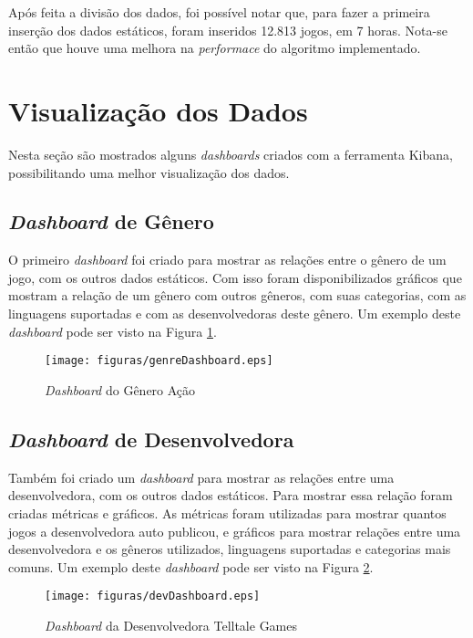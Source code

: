 Após feita a divisão dos dados, foi possível notar que, para fazer a primeira inserção dos dados estáticos, foram inseridos 12.813 jogos, em 7 horas. Nota-se então que houve uma melhora na \textit{performace} do algoritmo implementado.

\section{Visualização dos Dados}
Nesta seção são mostrados alguns \textit{dashboards} criados com a ferramenta Kibana, possibilitando uma melhor visualização dos dados.

\subsection*{\textit{Dashboard} de Gênero}
O primeiro \textit{dashboard} foi criado para mostrar as relações entre o gênero de um jogo, com os outros dados estáticos. Com isso foram disponibilizados gráficos que mostram a relação de um gênero com outros gêneros, com suas categorias, com as linguagens suportadas e com as desenvolvedoras deste gênero. Um exemplo deste \textit{dashboard} pode ser visto na Figura \ref{image:genreDash}.
\begin{figure} [H]
\centering
\texttt{[image: figuras/genreDashboard.eps]}
\caption{\textit{Dashboard} do Gênero Ação}
\label{image:genreDash}
\end{figure}

\subsection*{\textit{Dashboard} de Desenvolvedora}
Também foi criado um \textit{dashboard} para mostrar as relações entre uma desenvolvedora, com os outros dados estáticos. Para mostrar essa relação foram criadas métricas e gráficos. As métricas foram utilizadas para mostrar quantos jogos a desenvolvedora auto publicou, e gráficos para mostrar relações entre uma desenvolvedora e os gêneros utilizados, linguagens suportadas e categorias mais comuns. Um exemplo deste \textit{dashboard} pode ser visto na Figura \ref{image:devDash}.
\begin{figure} [H]
\centering
\texttt{[image: figuras/devDashboard.eps]}
\caption{\textit{Dashboard} da Desenvolvedora Telltale Games}
\label{image:devDash}
\end{figure}